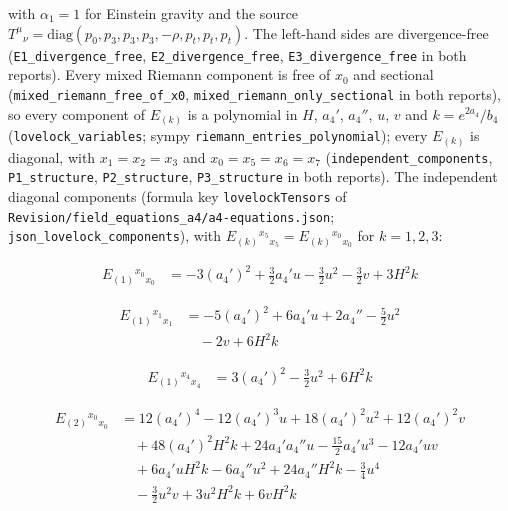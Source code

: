 \documentclass[11pt]{article}
\begin{document}
with $\alpha_1 = 1$ for Einstein gravity and the source $T^\mu{}_\nu = \mathrm{diag}(p_0, p_3, p_3, p_3, -\rho, p_t, p_t, p_t)$. The left-hand sides are divergence-free (\texttt{E1\_diver\allowbreak{}gence\_fr\allowbreak{}ee}, \texttt{E2\_diver\allowbreak{}gence\_fr\allowbreak{}ee}, \texttt{E3\_diver\allowbreak{}gence\_fr\allowbreak{}ee} in both reports). Every mixed Riemann component is free of $x_0$ and sectional (\texttt{mixed\_ri\allowbreak{}emann\_fr\allowbreak{}ee\_of\_x0}, \texttt{mixed\_ri\allowbreak{}emann\_on\allowbreak{}ly\_secti\allowbreak{}onal} in both reports), so every component of $E_{(k)}$ is a polynomial in $H$, $a_4'$, $a_4''$, $u$, $v$ and $k = e^{2a_4}/b_4$ (\texttt{lovelock\allowbreak{}\_variabl\allowbreak{}es}; sympy \texttt{riemann\_\allowbreak{}entries\_\allowbreak{}polynomi\allowbreak{}al}); every $E_{(k)}$ is diagonal, with $x_1 = x_2 = x_3$ and $x_0 = x_5 = x_6 = x_7$ (\texttt{independ\allowbreak{}ent\_comp\allowbreak{}onents}, \texttt{P1\_struc\allowbreak{}ture}, \texttt{P2\_struc\allowbreak{}ture}, \texttt{P3\_struc\allowbreak{}ture} in both reports). The independent diagonal components (formula key \texttt{lovelock\allowbreak{}Tensors} of \texttt{Revision\allowbreak{}/field\_e\allowbreak{}quations\allowbreak{}\_a4/a4-e\allowbreak{}quations\allowbreak{}.json}; \texttt{json\_lov\allowbreak{}elock\_co\allowbreak{}mponents}), with $E_{(k)}{}^{x_5}{}_{x_5} = E_{(k)}{}^{x_0}{}_{x_0}$ for $k = 1, 2, 3$:

\[
\begin{aligned}
E_{(1)}{}^{x_0}{}_{x_0} &= -3 (a_4')^{2} + \tfrac{3}{2} a_4' u - \tfrac{3}{2} u^{2} - \tfrac{3}{2} v + 3 H^{2} k
\end{aligned}
\]

\[
\begin{aligned}
E_{(1)}{}^{x_1}{}_{x_1} &= -5 (a_4')^{2} + 6 a_4' u + 2 a_4'' - \tfrac{5}{2} u^{2} \\
&\quad - 2 v + 6 H^{2} k
\end{aligned}
\]

\[
\begin{aligned}
E_{(1)}{}^{x_4}{}_{x_4} &= 3 (a_4')^{2} - \tfrac{3}{2} u^{2} + 6 H^{2} k
\end{aligned}
\]

\[
\begin{aligned}
E_{(2)}{}^{x_0}{}_{x_0} &= 12 (a_4')^{4} - 12 (a_4')^{3} u + 18 (a_4')^{2} u^{2} + 12 (a_4')^{2} v \\
&\quad + 48 (a_4')^{2} H^{2} k + 24 a_4' a_4'' u - \tfrac{15}{2} a_4' u^{3} - 12 a_4' u v \\
&\quad + 6 a_4' u H^{2} k - 6 a_4'' u^{2} + 24 a_4'' H^{2} k - \tfrac{3}{4} u^{4} \\
&\quad - \tfrac{3}{2} u^{2} v + 3 u^{2} H^{2} k + 6 v H^{2} k
\end{aligned}
\]
\end{document}
